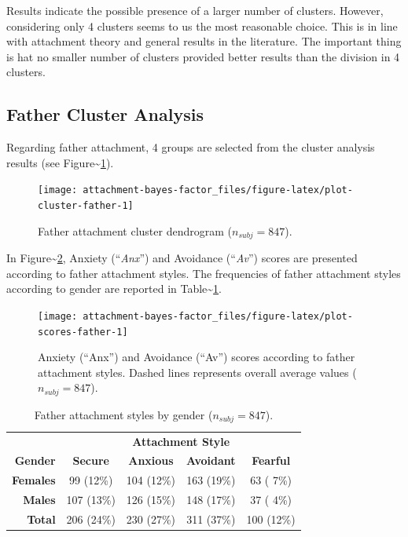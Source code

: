 \documentclass[
]{book}
\begin{document}
Results indicate the possible presence of a larger number of clusters. However, considering only 4 clusters seems to us the most reasonable choice. This is in line with attachment theory and general results in the literature. The important thing is hat no smaller number of clusters provided better results than the division in 4 clusters.

\hypertarget{father-cluster-analysis}{%
\subsection{Father Cluster Analysis}\label{father-cluster-analysis}}

Regarding father attachment, 4 groups are selected from the cluster analysis results (see Figure\textasciitilde\ref{fig:plot-cluster-father}).

\begin{figure}

{\centering \texttt{[image: attachment-bayes-factor\_files/figure-latex/plot-cluster-father-1]} 

}

\caption{Father attachment cluster dendrogram ($n_{subj} = 847$).}\label{fig:plot-cluster-father}
\end{figure}

In Figure\textasciitilde\ref{fig:plot-scores-father}, Anxiety (``\emph{Anx}'') and Avoidance (``\emph{Av}'') scores are presented according to father attachment styles. The frequencies of father attachment styles according to gender are reported in Table\textasciitilde{}\ref{tab:table-cluster-father}.

\begin{figure}

{\centering \texttt{[image: attachment-bayes-factor\_files/figure-latex/plot-scores-father-1]} 

}

\caption{Anxiety (“Anx”) and Avoidance (“Av”) scores according to father attachment styles. Dashed lines represents overall average values ($n_{subj} = 847$).}\label{fig:plot-scores-father}
\end{figure}

\begin{table}[!h]

\caption{\label{tab:table-cluster-father}Father attachment styles by gender ($n_{subj} = 847$).}
\centering
\begin{tabular}[t]{>{}rcccc}
\toprule
\multicolumn{1}{c}{\textbf{ }} & \multicolumn{4}{c}{\textbf{Attachment Style}} \\
\cmidrule(l{3pt}r{3pt}){2-5}
\textbf{Gender} & \textbf{Secure} & \textbf{Anxious} & \textbf{Avoidant} & \textbf{Fearful}\\
\midrule
\textbf{Females} & 99 (12\%) & 104 (12\%) & 163 (19\%) & 63 ( 7\%)\\
\textbf{Males} & 107 (13\%) & 126 (15\%) & 148 (17\%) & 37 ( 4\%)\\
\textbf{Total} & 206 (24\%) & 230 (27\%) & 311 (37\%) & 100 (12\%)\\
\bottomrule
\end{tabular}
\end{table}
\end{document}
